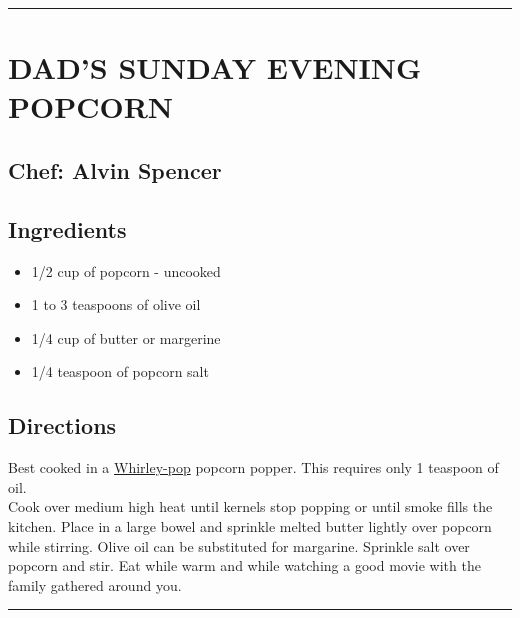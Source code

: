 \documentclass[
]{book}
\providecommand{\tightlist}{%
  \setlength{\itemsep}{0pt}\setlength{\parskip}{0pt}}
\begin{document}
\begin{center}\rule{0.5\linewidth}{0.5pt}\end{center}

\hypertarget{dads-sunday-evening-popcorn}{%
\section*{DAD'S SUNDAY EVENING POPCORN}\label{dads-sunday-evening-popcorn}}

\hypertarget{chef-alvin-spencer}{%
\subsection*{Chef: Alvin Spencer}\label{chef-alvin-spencer}}

\hypertarget{ingredients-4}{%
\subsection*{Ingredients}\label{ingredients-4}}

\begin{itemize}
\tightlist
\item
  1/2 cup of popcorn - uncooked
\item
  1 to 3 teaspoons of olive oil
\item
  1/4 cup of butter or margerine
\item
  1/4 teaspoon of popcorn salt
\end{itemize}

\hypertarget{directions-4}{%
\subsection*{Directions}\label{directions-4}}

Best cooked in a \href{https://www.whirleypopshop.com/}{Whirley-pop} popcorn popper. This requires only 1 teaspoon of oil.\\
Cook over medium high heat until kernels stop popping or until smoke fills the kitchen.
Place in a large bowel and sprinkle melted butter lightly over popcorn while stirring. Olive oil can be substituted for margarine.
Sprinkle salt over popcorn and stir. Eat while warm and while watching a good movie with the family gathered around you.

\begin{center}\rule{0.5\linewidth}{0.5pt}\end{center}
\end{document}

